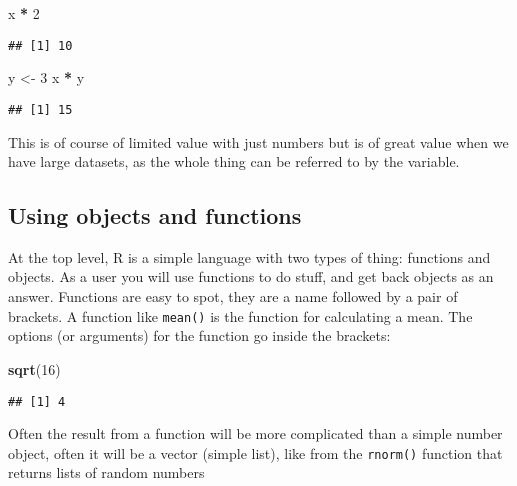 \documentclass[
]{book}
\newenvironment{Shaded}{\begin{snugshade}}{\end{snugshade}}
\newcommand{\DecValTok}[1]{\textcolor[rgb]{0.00,0.00,0.81}{#1}}
\newcommand{\KeywordTok}[1]{\textcolor[rgb]{0.13,0.29,0.53}{\textbf{#1}}}
\newcommand{\NormalTok}[1]{#1}
\newcommand{\OperatorTok}[1]{\textcolor[rgb]{0.81,0.36,0.00}{\textbf{#1}}}
\newcommand{\StringTok}[1]{\textcolor[rgb]{0.31,0.60,0.02}{#1}}
\begin{document}
\begin{Shaded}
\begin{Highlighting}[]
\NormalTok{ x }\OperatorTok{*}\StringTok{ }\DecValTok{2}
\end{Highlighting}
\end{Shaded}

\begin{verbatim}
## [1] 10
\end{verbatim}

\begin{Shaded}
\begin{Highlighting}[]
\NormalTok{y <-}\StringTok{ }\DecValTok{3}
\NormalTok{x }\OperatorTok{*}\StringTok{ }\NormalTok{y}
\end{Highlighting}
\end{Shaded}

\begin{verbatim}
## [1] 15
\end{verbatim}

This is of course of limited value with just numbers but is of great value when we have large datasets, as the whole thing can be referred to by the variable.

\hypertarget{using-objects-and-functions}{%
\subsection{Using objects and functions}\label{using-objects-and-functions}}

At the top level, R is a simple language with two types of thing: functions and objects. As a user you will use functions to do stuff, and get back objects as an answer. Functions are easy to spot, they are a name followed by a pair of brackets. A function like \texttt{mean()} is the function for calculating a mean. The options (or arguments) for the function go inside the brackets:

\begin{Shaded}
\begin{Highlighting}[]
\KeywordTok{sqrt}\NormalTok{(}\DecValTok{16}\NormalTok{)}
\end{Highlighting}
\end{Shaded}

\begin{verbatim}
## [1] 4
\end{verbatim}

Often the result from a function will be more complicated than a simple number object, often it will be a vector (simple list), like from the \texttt{rnorm()} function that returns lists of random numbers
\end{document}
